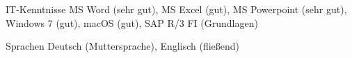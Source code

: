 

\begin{cvskills}

  \cvskill
    {IT-Kenntnisse} %
    {MS Word (sehr gut), MS Excel (gut), MS Powerpoint (sehr gut), Windows 7 (gut), macOS (gut), SAP R/3 FI (Grundlagen)} %


  \cvskill
    {Sprachen} %
    {Deutsch (Muttersprache), Englisch (fließend)} %
    

\end{cvskills}
